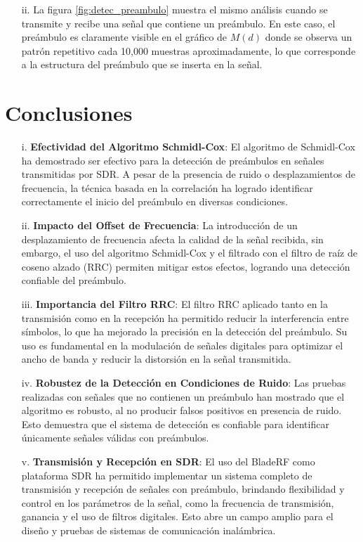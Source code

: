 \documentclass[letterpaper,12pt,oneside]{article}
\begin{document}
\begin{itemize}
    \item[ii.] La figura \ref{fig:detec_preambulo} muestra el mismo análisis cuando se transmite y recibe una señal que contiene un preámbulo. En este caso, el preámbulo es claramente visible en el gráfico de \(M(d)\) donde se observa un patrón repetitivo cada 10,000 muestras aproximadamente, lo que corresponde a la estructura del preámbulo que se inserta en la señal.
\end{itemize}

\section{Conclusiones}

\begin{itemize}
    \item[i.] \textbf{Efectividad del Algoritmo Schmidl-Cox}: El algoritmo de Schmidl-Cox ha demostrado ser efectivo para la detección de preámbulos en señales transmitidas por SDR. A pesar de la presencia de ruido o desplazamientos de frecuencia, la técnica basada en la correlación ha logrado identificar correctamente el inicio del preámbulo en diversas condiciones.

    \item[ii.] \textbf{Impacto del Offset de Frecuencia}: La introducción de un desplazamiento de frecuencia afecta la calidad de la señal recibida, sin embargo, el uso del algoritmo Schmidl-Cox y el filtrado con el filtro de raíz de coseno alzado (RRC) permiten mitigar estos efectos, logrando una detección confiable del preámbulo.

    \item[iii.] \textbf{Importancia del Filtro RRC}: El filtro RRC aplicado tanto en la transmisión como en la recepción ha permitido reducir la interferencia entre símbolos, lo que ha mejorado la precisión en la detección del preámbulo. Su uso es fundamental en la modulación de señales digitales para optimizar el ancho de banda y reducir la distorsión en la señal transmitida.

    \item[iv.] \textbf{Robustez de la Detección en Condiciones de Ruido}: Las pruebas realizadas con señales que no contienen un preámbulo han mostrado que el algoritmo es robusto, al no producir falsos positivos en presencia de ruido. Esto demuestra que el sistema de detección es confiable para identificar únicamente señales válidas con preámbulos.

    \item[v.] \textbf{Transmisión y Recepción en SDR}: El uso del BladeRF como plataforma SDR ha permitido implementar un sistema completo de transmisión y recepción de señales con preámbulo, brindando flexibilidad y control en los parámetros de la señal, como la frecuencia de transmisión, ganancia y el uso de filtros digitales. Esto abre un campo amplio para el diseño y pruebas de sistemas de comunicación inalámbrica.
\end{itemize}
\end{document}
